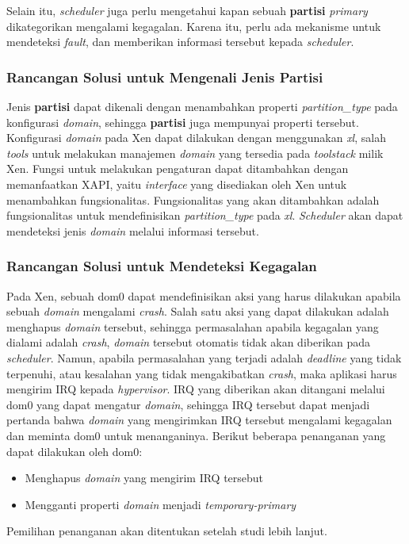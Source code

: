 Selain itu, \textit{scheduler} juga perlu mengetahui kapan sebuah \textbf{partisi} \textit{primary} dikategorikan mengalami kegagalan.
Karena itu, perlu ada mekanisme untuk mendeteksi \textit{fault}, dan memberikan informasi tersebut kepada \textit{scheduler}.

\subsubsection{Rancangan Solusi untuk Mengenali Jenis \textbf{Partisi}}

Jenis \textbf{partisi} dapat dikenali dengan menambahkan properti \textit{partition\_type} pada konfigurasi \textit{domain}, sehingga \textbf{partisi} juga mempunyai properti tersebut.
Konfigurasi \textit{domain} pada Xen dapat dilakukan dengan menggunakan \textit{xl}, salah \textit{tools} untuk melakukan manajemen \textit{domain} yang tersedia pada \textit{toolstack} milik Xen.
Fungsi untuk melakukan pengaturan dapat ditambahkan dengan memanfaatkan XAPI, yaitu \textit{interface} yang disediakan oleh Xen untuk menambahkan fungsionalitas.
Fungsionalitas yang akan ditambahkan adalah fungsionalitas untuk mendefinisikan \textit{partition\_type} pada \textit{xl}.
\textit{Scheduler} akan dapat mendeteksi jenis \textit{domain} melalui informasi tersebut.

\subsubsection{Rancangan Solusi untuk Mendeteksi Kegagalan}

Pada Xen, sebuah dom0 dapat mendefinisikan aksi yang harus dilakukan apabila sebuah \textit{domain} mengalami \textit{crash}.
Salah satu aksi yang dapat dilakukan adalah menghapus \textit{domain} tersebut, sehingga permasalahan apabila kegagalan yang dialami adalah \textit{crash}, \textit{domain} tersebut otomatis tidak akan diberikan pada \textit{scheduler}.
Namun, apabila permasalahan yang terjadi adalah \textit{deadline} yang tidak terpenuhi, atau kesalahan yang tidak mengakibatkan \textit{crash}, maka aplikasi harus mengirim IRQ kepada \textit{hypervisor}.
IRQ yang diberikan akan ditangani melalui dom0 yang dapat mengatur \textit{domain}, sehingga IRQ tersebut dapat menjadi pertanda bahwa \textit{domain} yang mengirimkan IRQ tersebut mengalami kegagalan dan meminta dom0 untuk menanganinya.
Berikut beberapa penanganan yang dapat dilakukan oleh dom0:
\begin{itemize}
    \item Menghapus \textit{domain} yang mengirim IRQ tersebut
    \item Mengganti properti \textit{domain} menjadi \textit{temporary-primary}
\end{itemize}
Pemilihan penanganan akan ditentukan setelah studi lebih lanjut.

